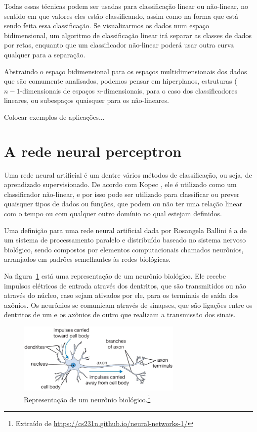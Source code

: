 Todas essas técnicas podem ser usadas para classificação linear ou não-linear, no sentido em que valores eles estão classificando, assim como na forma que está sendo feita essa classificação. Se visualizarmos os dados num espaço bidimensional, um algoritmo de classificação linear irá separar as classes de dados por retas, enquanto que um classificador não-linear poderá usar outra curva qualquer para a separação. 

Abstraindo o espaço bidimensional para os espaços multidimensionais dos dados que são comumente analisados, podemos pensar em hiperplanos, estruturas ($n{-}1$-dimensionais de espaços $n$-dimensionais, para o caso dos classificadores lineares, ou subespaços quaisquer para os não-lineares.

Colocar exemplos de aplicações...

\section{A rede neural perceptron}

Uma rede neural artificial é um dentre vários métodos de classificação, ou seja, de aprendizado supervisionado. De acordo com Kopec \citep{classic}, ele é utilizado como um classificador não-linear, e por isso pode ser utilizado para classificar ou prever quaisquer tipos de dados ou funções, que podem ou não ter uma relação linear com o tempo ou com qualquer outro domínio no qual estejam definidos.

Uma definição para uma rede neural artificial dada por Rosangela Ballini \citep{doutorado} é a de um sistema de processamento paralelo e distribuído baseado no sistema nervoso biológico, sendo compostos por elementos computacionais chamados neurônios, arranjados em padrões semelhantes às redes biológicas.

Na figura~\ref{fig:neuron} está uma representação de um neurônio biológico. Ele recebe impulsos elétricos de entrada através dos dentritos, que são transmitidos ou não através do núcleo, caso sejam ativados por ele, para os terminais de saída dos axônios. Os neurônios se comunicam através de sinapses, que são ligações entre os dentritos de um e os axônios de outro que realizam a transmissão dos sinais. 

\begin{figure}[htb]
\centering
\includegraphics[width=8cm]{figuras/neuron}
\caption{Representação de um neurônio biológico.\footnote{Extraído de \url{https://cs231n.github.io/neural-networks-1/}}}
\label{fig:neuron}
\end{figure}

